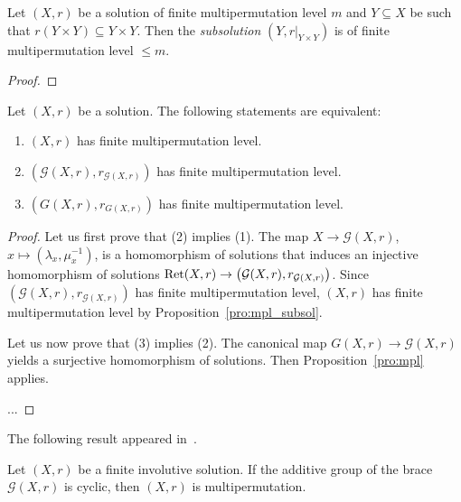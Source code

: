 \begin{proposition}
\label{pro:mpl_subsol}
Let $(X,r)$ be a solution of finite multipermutation level $m$ 
and $Y\subseteq X$ be such that $r(Y\times Y)\subseteq Y\times Y$. 
Then the \emph{subsolution} $(Y,r|_{Y\times Y})$ is of finite multipermutation level $\leq m$. 
\end{proposition}

\begin{proof}

\end{proof}

\begin{theorem}
Let $(X,r)$ be a solution. The following statements are equivalent:
\begin{enumerate}
    \item $(X,r)$ has finite multipermutation level.
    \item $\left(\mathcal{G}(X,r),r_{\mathcal{G}(X,r)}\right)$ has finite multipermutation level.
    \item $\left(G(X,r),r_{G(X,r)}\right)$ has finite multipermutation level.
\end{enumerate}
\end{theorem}

\begin{proof}
    Let us first prove that (2) implies (1). 
    The map $X\to\mathcal{G}(X,r)$, $x\mapsto(\lambda_x,\mu_x^{-1})$, is a homomorphism of solutions that induces
    an injective homomorphism of solutions $\operatorname{Ret}(X,r)\to\left(\mathcal{G}(X,r),r_{\mathcal{G}(X,r)}\right)$. 
    Since $\left(\mathcal{G}(X,r),r_{\mathcal{G}(X,r)}\right)$ has finite multipermutation level,
    $(X,r)$ has finite multipermutation level by Proposition~\ref{pro:mpl_subsol}.
    
    Let us now prove that (3) implies (2). The canonical map $G(X,r)\to\mathcal{G}(X,r)$ yields a surjective
    homomorphism of solutions. Then Proposition~\ref{pro:mpl} applies. 

    ...
\end{proof}

The following result appeared in~\cite{MR1722951}.

\begin{proposition}
Let $(X,r)$ be a finite involutive solution. If the additive group 
of the brace $\mathcal{G}(X,r)$ is cyclic, then $(X,r)$ 
is multipermutation.
\end{proposition}

